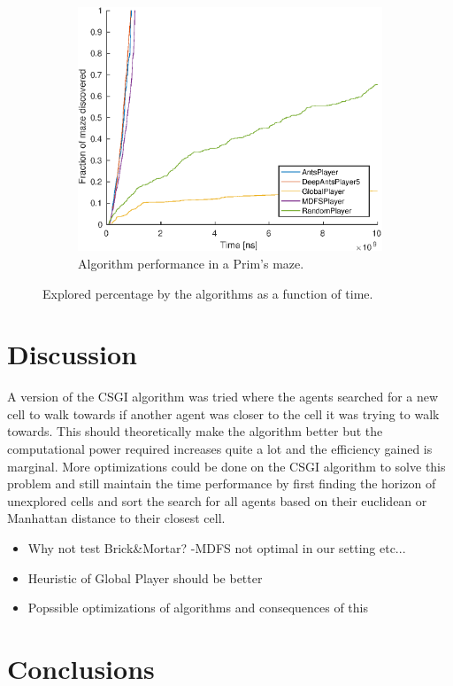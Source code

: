 \documentclass{article}
\begin{document}
\begin{figure}[H]
    \begin{subfigure}[b]{0.45\textwidth}
        \includegraphics[width=\textwidth]{Covered_vs_time_for_3_agents_on_50x50_map_Easy=10.eps}
        \caption{ Algorithm performance in a Prim's maze. }
    \end{subfigure}
    
    \caption{Explored percentage by the algorithms as a function of
      time.}
    \label{fig:perf_time}
\end{figure}

\section{Discussion}

A version of the CSGI algorithm was tried where the agents searched for a new cell to walk towards if another agent was closer to the cell it was trying to walk towards. This should theoretically make the algorithm better but the computational power required increases quite a lot and the efficiency gained is marginal. More optimizations could be done on the CSGI algorithm to solve this problem and still maintain the time performance by first finding the horizon of unexplored cells and sort the search for all agents based on their euclidean or Manhattan distance to their closest cell.





\begin{itemize}
    \item Why not test Brick\&Mortar? -MDFS not optimal in our setting etc...
    \item Heuristic of Global Player should be better
    \item Popssible optimizations of algorithms and consequences of this
\end{itemize}

\section{Conclusions}




\end{document}
